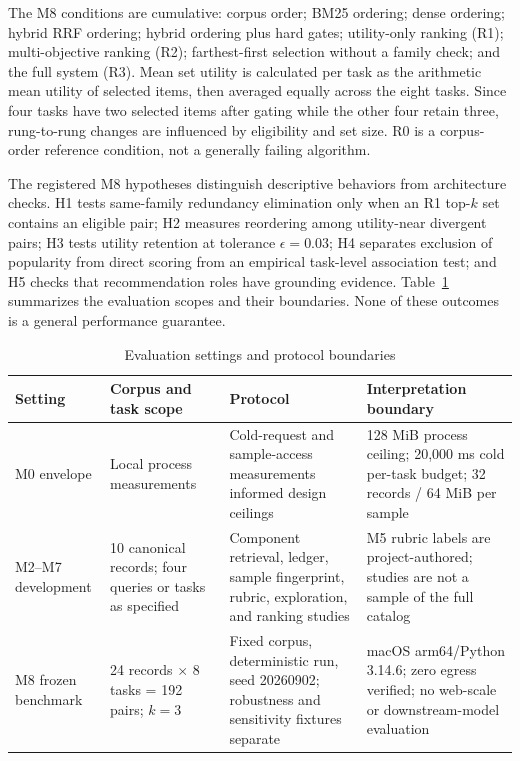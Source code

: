 \documentclass[conference]{IEEEtran}
\begin{document}
The M8 conditions are cumulative: corpus order; BM25 ordering; dense ordering; hybrid RRF ordering; hybrid ordering plus hard gates; utility-only ranking (R1); multi-objective ranking (R2); farthest-first selection without a family check; and the full system (R3). Mean set utility is calculated per task as the arithmetic mean utility of selected items, then averaged equally across the eight tasks. Since four tasks have two selected items after gating while the other four retain three, rung-to-rung changes are influenced by eligibility and set size. R0 is a corpus-order reference condition, not a generally failing algorithm.

The registered M8 hypotheses distinguish descriptive behaviors from architecture checks. H1 tests same-family redundancy elimination only when an R1 top-$k$ set contains an eligible pair; H2 measures reordering among utility-near divergent pairs; H3 tests utility retention at tolerance $\epsilon=0.03$; H4 separates exclusion of popularity from direct scoring from an empirical task-level association test; and H5 checks that recommendation roles have grounding evidence. Table~\ref{tab:protocol} summarizes the evaluation scopes and their boundaries. None of these outcomes is a general performance guarantee.

\begin{table}[t]
\caption{Evaluation settings and protocol boundaries}
\label{tab:protocol}
\centering
\footnotesize
\begin{tabularx}{\textwidth}{p{1.1in}p{1.35in}X p{1.6in}}
\toprule
Setting & Corpus and task scope & Protocol & Interpretation boundary\\
\midrule
M0 envelope & Local process measurements & Cold-request and sample-access measurements informed design ceilings & 128 MiB process ceiling; 20,000 ms cold per-task budget; 32 records / 64 MiB per sample\\
M2--M7 development & 10 canonical records; four queries or tasks as specified & Component retrieval, ledger, sample fingerprint, rubric, exploration, and ranking studies & M5 rubric labels are project-authored; studies are not a sample of the full catalog\\
M8 frozen benchmark & 24 records $\times$ 8 tasks = 192 pairs; $k=3$ & Fixed corpus, deterministic run, seed 20260902; robustness and sensitivity fixtures separate & macOS arm64/Python 3.14.6; zero egress verified; no web-scale or downstream-model evaluation\\
\bottomrule
\end{tabularx}
\end{table}
\end{document}
